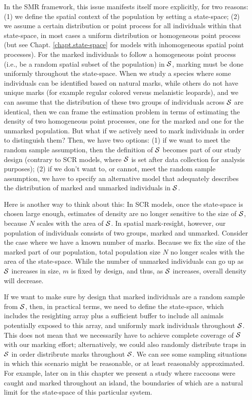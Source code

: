 In the SMR framework, this issue manifests itself more explicitly, for
two reasons: (1) we define the spatial context of the population by
setting a state-space; (2) we assume a certain distribution or
point process for all individuals within that state-space, in most
cases a uniform distribution or homogeneous point process (but see
Chapt. \ref{chapt.state-space} for models with inhomogeneous spatial
point processes). For the marked individuals to follow a homogeneous point process (i.e.,
 be a random spatial subset
of the population) in ${\cal S}$, marking must be done uniformly throughout the state-space.
When we study a species where some
individuals can be identified based on natural marks, while others do
not have unique marks (for example regular colored versus melanistic
leopards), and we can assume that the distribution of these two groups
of individuals across ${\cal S}$ are identical, then we can frame the
estimation problem in terms of estimating the density of two
homogeneous point processes, one for the marked and one for the unmarked
population.
But what if we actively need to mark
individuals in order to distinguish them?  Then, we have two options: (1) if we want to meet
the random sample assumption, then the definition of ${\cal S}$ becomes
part of our study design (contrary to SCR models, where ${\cal S}$ is set after data collection for analysis
purposes); (2) if we don't want to, or cannot, meet the random sample assumption, we have to specify an alternative model that adequately describes the distribution of marked and unmarked individuals in ${\cal S}$.

Here is another way to think about this: In SCR models, once the
state-space is chosen large enough, estimates of density are no longer
sensitive to the size of ${\cal S}$, because $N$ scales with the area
of ${\cal S}$. In spatial mark-resight, however, our population of
individuals consists of two groups, marked and unmarked. Consider the
case where we have a known number of marks. Because we fix the size of
the marked part of our population, total population size $N$ no longer
scales with the area of the state-space. While the number of unmarked
individuals can go up as ${\cal S}$ increases in size, $m$ is fixed by
design, and thus, as ${\cal S}$ increases, overall density will
decrease.

If we want to make sure by design that marked individuals are a
random sample from ${\cal S}$, then, in practical terms, we need to
define the state-space, which includes the resighting array plus
a sufficient buffer to include all animals potentially exposed to this
array, and uniformly mark individuals throughout ${\cal S}$. This does not mean that we necessarily have to achieve complete coverage of ${\cal S}$ with our marking effort; alternatively, we could also randomly distribute traps in ${\cal S}$ in order distribrute marks throughout ${\cal S}$.
We can see some sampling situations in which this
scenario might be reasonable, or at least reasonably
approximated. For example, later on in this chapter we present a study
where raccoons were caught and marked throughout an island, the
boundaries of which are a natural limit for the state-space of this
particular system.

